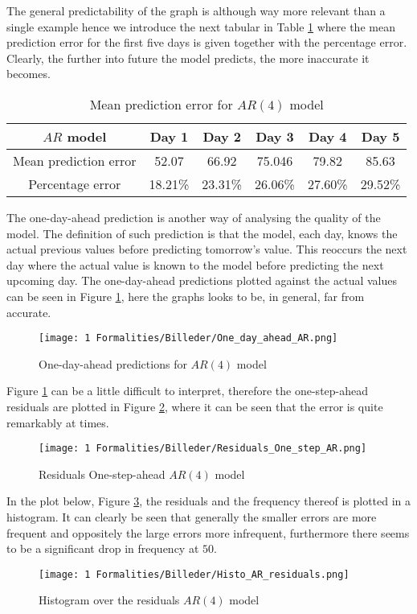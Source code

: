 \noindent The general predictability of the graph is although way more relevant than a single example hence we introduce the next tabular in Table \ref{tab:AR_mean_prediction_error} where the mean prediction error for the first five days is given together with the percentage error. Clearly, the further into future the model predicts, the more inaccurate it becomes. 
\begin{table}[H]
  \centering
  \begin{tabular}{|c|c|c|c|c|c|}
    \hline
   $AR$ model & Day 1 & Day 2 & Day 3 & Day 4 & Day 5 \\
    \hline
    Mean prediction error & 52.07 & 66.92 & 75.046 & 79.82 & 85.63   \\
    \hline
    Percentage error & 18.21\% & 23.31\% & 26.06\% & 27.60\% & 29.52\%  \\
    \hline
    
  \end{tabular}
  \caption{Mean prediction error for $AR(4)$ model}
  \label{tab:AR_mean_prediction_error}
\end{table}
\noindent The one-day-ahead prediction is another way of analysing the quality of the model. The definition of such prediction is that the model, each day, knows the actual previous values before predicting tomorrow's value. This reoccurs the next day where the actual value is known to the model before predicting the next upcoming day. The one-day-ahead predictions plotted against the actual values can be seen in Figure \ref{fig:One_day_ahead_AR}, here the graphs looks to be, in general, far from accurate.
\begin{figure}[H]
    \centering
    \texttt{[image: 1 Formalities/Billeder/One\_day\_ahead\_AR.png]}
    \caption{One-day-ahead predictions for $AR(4)$ model}
    \label{fig:One_day_ahead_AR}
\end{figure}

\noindent Figure \ref{fig:One_day_ahead_AR} can be a little difficult to interpret, therefore the one-step-ahead residuals are plotted in Figure \ref{fig:Residuals_One_step_AR}, where it can be seen that the error is quite remarkably at times.

\begin{figure}[H]
    \centering
    \texttt{[image: 1 Formalities/Billeder/Residuals\_One\_step\_AR.png]}
    \caption{Residuals One-step-ahead $AR(4)$ model}
    \label{fig:Residuals_One_step_AR}
\end{figure}
\noindent In the plot below, Figure \ref{fig:Histogram_residuals_AR_model}, the residuals and the frequency thereof is plotted in a histogram. It can clearly be seen that generally the smaller errors are more frequent and oppositely the large errors more infrequent, furthermore there seems to be a significant drop in frequency at $50$.
\begin{figure}[H]
    \centering
    \texttt{[image: 1 Formalities/Billeder/Histo\_AR\_residuals.png]}
    \caption{Histogram over the residuals $AR(4)$ model}
    \label{fig:Histogram_residuals_AR_model}
\end{figure}
